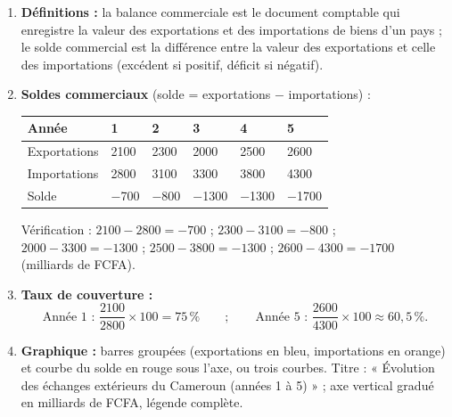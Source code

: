 \documentclass[11pt]{article}
\newcommand{\cle}[1]{{\popxbold\color{popdark}#1}}
\begin{document}
\begin{corrige}
\begin{enumerate}
\item \textbf{Définitions :} la \cle{balance commerciale} est le document comptable qui enregistre la valeur des exportations et des importations de biens d'un pays ; le \cle{solde commercial} est la différence entre la valeur des exportations et celle des importations (excédent si positif, déficit si négatif).
\item \textbf{Soldes commerciaux} (solde = exportations $-$ importations) :
\begin{center}
\begin{tabularx}{\linewidth}{|l|>{\centering\arraybackslash}X|>{\centering\arraybackslash}X|>{\centering\arraybackslash}X|>{\centering\arraybackslash}X|>{\centering\arraybackslash}X|}
\hline
\rowcolor{popblueL} \textbf{Année} & \textbf{1} & \textbf{2} & \textbf{3} & \textbf{4} & \textbf{5} \\
\hline
Exportations & \num{2100} & \num{2300} & \num{2000} & \num{2500} & \num{2600} \\
\hline
Importations & \num{2800} & \num{3100} & \num{3300} & \num{3800} & \num{4300} \\
\hline
Solde & \num{-700} & \num{-800} & \num{-1300} & \num{-1300} & \num{-1700} \\
\hline
\end{tabularx}
\end{center}
Vérification : $2100-2800=-700$ ; $2300-3100=-800$ ; $2000-3300=-1300$ ; $2500-3800=-1300$ ; $2600-4300=-1700$ (milliards de FCFA).
\item \textbf{Taux de couverture :}
\[ \text{Année 1 : } \frac{2100}{2800}\times 100 = 75\,\% \qquad ; \qquad \text{Année 5 : } \frac{2600}{4300}\times 100 \approx 60,5\,\%. \]
\item \textbf{Graphique :} barres groupées (exportations en bleu, importations en orange) et courbe du solde en rouge sous l'axe, ou trois courbes. Titre : « Évolution des échanges extérieurs du Cameroun (années 1 à 5) » ; axe vertical gradué en milliards de FCFA, légende complète.

\end{enumerate}
\end{corrige}
\end{document}
